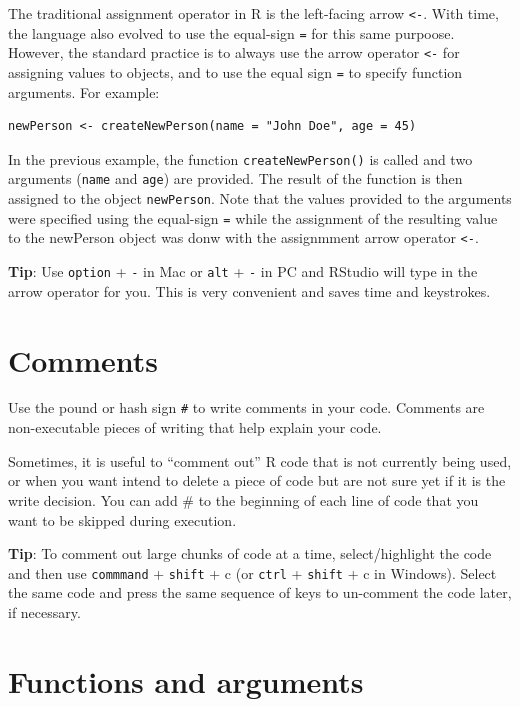 \documentclass[]{book}
\begin{document}
The traditional assignment operator in R is the left-facing arrow \texttt{\textless{}-}. With time, the language also evolved to use the equal-sign \texttt{=} for this same purpoose. However, the standard practice is to always use the arrow operator \texttt{\textless{}-} for assigning values to objects, and to use the equal sign \texttt{=} to specify function arguments. For example:

\begin{verbatim}
newPerson <- createNewPerson(name = "John Doe", age = 45)
\end{verbatim}

In the previous example, the function \texttt{createNewPerson()} is called and two arguments (\texttt{name} and \texttt{age}) are provided. The result of the function is then assigned to the object \texttt{newPerson}. Note that the values provided to the arguments were specified using the equal-sign \texttt{=} while the assignment of the resulting value to the newPerson object was donw with the assignmment arrow operator \texttt{\textless{}-}.

\textbf{Tip}: Use \texttt{option} + \texttt{-} in Mac or \texttt{alt} + \texttt{-} in PC and RStudio will type in the arrow operator for you. This is very convenient and saves time and keystrokes.

\hypertarget{comments}{%
\section{Comments}\label{comments}}

Use the pound or hash sign \texttt{\#} to write comments in your code. Comments are non-executable pieces of writing that help explain your code.

Sometimes, it is useful to ``comment out'' R code that is not currently being used, or when you want intend to delete a piece of code but are not sure yet if it is the write decision. You can add \# to the beginning of each line of code that you want to be skipped during execution.

\textbf{Tip}: To comment out large chunks of code at a time, select/highlight the code and then use \texttt{commmand} + \texttt{shift} + c (or \texttt{ctrl} + \texttt{shift} + c in Windows). Select the same code and press the same sequence of keys to un-comment the code later, if necessary.

\hypertarget{functions-and-arguments}{%
\section{Functions and arguments}\label{functions-and-arguments}}
\end{document}
